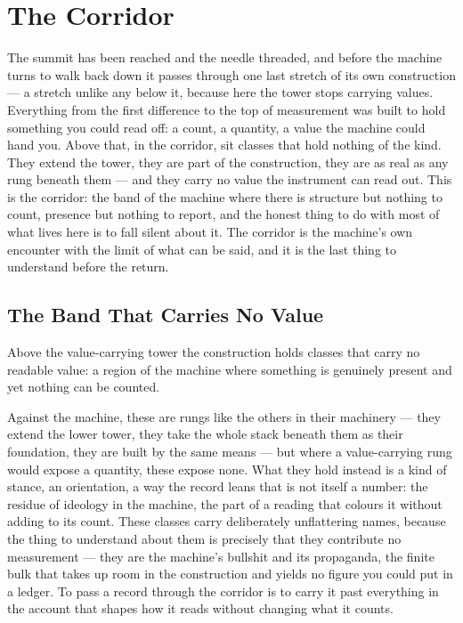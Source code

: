 \chapter{The Corridor}

The summit has been reached and the needle threaded, and before the machine turns to walk back down it passes
through one last stretch of its own construction --- a stretch unlike any below it, because here the tower stops
carrying values. Everything from the first difference to the top of measurement was built to hold something you
could read off: a count, a quantity, a value the machine could hand you. Above that, in the corridor, sit classes
that hold nothing of the kind. They extend the tower, they are part of the construction, they
are as real as any rung beneath them --- and they carry no value the instrument can read out. This is the
corridor: the band of the machine where there is structure but nothing to count, presence but nothing to report,
and the honest thing to do with most of what lives here is to fall silent about it. The corridor is the machine's
own encounter with the limit of what can be said, and it is the last thing to understand before the return.

\section{The Band That Carries No Value}

Above the value-carrying tower the construction holds classes that carry no readable value: a region of the
machine where something is genuinely present and yet nothing can be counted.

Against the machine, these are rungs like the others in their machinery --- they extend the lower tower, they take
the whole stack beneath them as their foundation, they are built by the same means --- but where a value-carrying
rung would expose a quantity, these expose none. What they hold instead is a kind of stance, an orientation, a
way the record leans that is not itself a number: the residue of ideology in the machine, the part of a reading
that colours it without adding to its count. These classes carry deliberately unflattering names, because the
thing to understand about them is precisely that they contribute no measurement --- they are the
machine's bullshit and its propaganda, the finite bulk that takes up room in the construction and yields no
figure you could put in a ledger. To pass a record through the corridor is to carry it past everything in the
account that shapes how it reads without changing what it counts.

